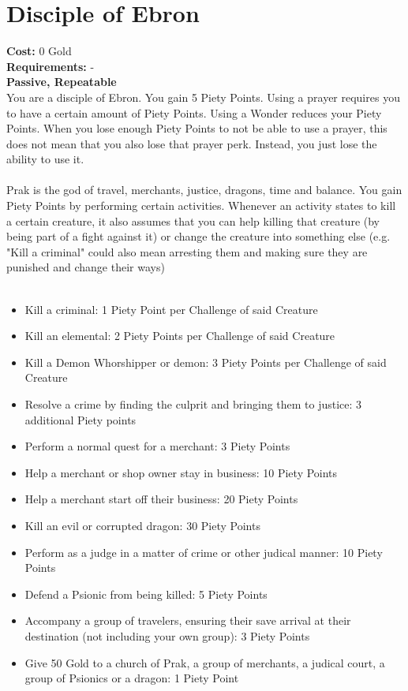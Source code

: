 \section*{Disciple of Ebron}
\textbf{Cost:} 0 Gold\\
\textbf{Requirements:} - \\
\textbf{Passive, Repeatable}\\
You are a disciple of Ebron. You gain 5 Piety Points. Using a prayer requires you to have a certain amount of Piety Points. Using a Wonder reduces your Piety Points. When you lose enough Piety Points to not be able to use a prayer, this does not mean that you also lose that prayer perk. Instead, you just lose the ability to use it.\\
\\
Prak is the god of travel, merchants, justice, dragons, time and balance. You gain Piety Points by performing certain activities. Whenever an activity states to kill a certain creature, it also assumes that you can help killing that creature (by being part of a fight against it) or change the creature into something else (e.g. "Kill a criminal" could also mean arresting them and making sure they are punished and change their ways)\\
\\
\begin{itemize}
	\item Kill a criminal: 1 Piety Point per Challenge of said Creature
	\item Kill an elemental: 2 Piety Points per Challenge of said Creature
	\item Kill a Demon Whorshipper or demon: 3 Piety Points per Challenge of said Creature
	\item Resolve a crime by finding the culprit and bringing them to justice: 3 additional Piety points
	\item Perform a normal quest for a merchant: 3 Piety Points
	\item Help a merchant or shop owner stay in business: 10 Piety Points
	\item Help a merchant start off their business: 20 Piety Points
	\item Kill an evil or corrupted dragon: 30 Piety Points
	\item Perform as a judge in a matter of crime or other judical manner: 10 Piety Points
	\item Defend a Psionic from being killed: 5 Piety Points
	\item Accompany a group of travelers, ensuring their save arrival at their destination (not including your own group): 3 Piety Points
	\item Give 50 Gold to a church of Prak, a group of merchants, a judical court, a group of Psionics or a dragon: 1 Piety Point
\end{itemize}


